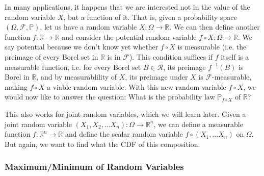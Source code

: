 \documentclass{article}
\theoremstyle{definition}
\theoremstyle{remark}
\theoremstyle{definition}
\begin{document}
In many applications, it happens that we are interested not in the value of the random variable $X$, but a function of it. That is, given a probability space $(\Omega, \mathcal{F}, \mathbb{P})$, let us have a random variable $X: \Omega \rightarrow \mathbb{R}$. We can then define another function $f: \mathbb{R} \rightarrow \mathbb{R}$ and consider the potential random variable $f \circ X : \Omega \rightarrow \mathbb{R}$. We say potential because we don't know yet whether $f \circ X$ is measurable (i.e. the preimage of every Borel set in $\mathbb{R}$ is in $\mathcal{F}$). This condition suffices if $f$ itself is a measurable function, i.e. for every Borel set $B \in \mathcal{R}$, its preimage $f^{-1} (B)$ is Borel in $\mathbb{R}$, and by measurablility of $X$, its preimage under $X$ is $\mathcal{F}$-measurable, making $f \circ X$ a viable random variable. With this new random variable $f \circ X$, we would now like to answer the question: What is the probability law $\mathbb{P}_{f \circ X}$ of $\mathbb{R}$? 

This also works for joint random variables, which we will learn later. Given a joint random variable $(X_1, X_2, \ldots X_n): \Omega \rightarrow \mathbb{R}^n$, we can define a measurable function $f: \mathbb{R}^n \longrightarrow \mathbb{R}$ and define the scalar random variable $f \circ (X_1, \ldots X_n)$ on $\Omega$. But again, we want to find what the CDF of this composition. 

\subsubsection{Maximum/Minimum of Random Variables}
\end{document}
